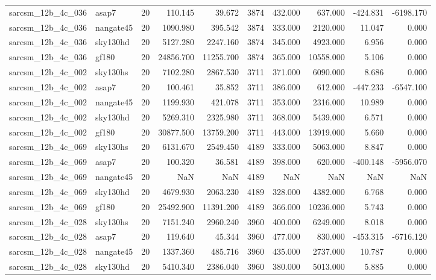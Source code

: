 \begin{longtable}{llrrrrrrrr}
sarcsm\_12b\_4c\_036 & asap7 & 20 & 110.145 & 39.672 & 3874 & 432.000 & 637.000 & -424.831 & -6198.170 \\
sarcsm\_12b\_4c\_036 & nangate45 & 20 & 1090.980 & 395.542 & 3874 & 333.000 & 2120.000 & 11.047 & 0.000 \\
sarcsm\_12b\_4c\_036 & sky130hd & 20 & 5127.280 & 2247.160 & 3874 & 345.000 & 4923.000 & 6.956 & 0.000 \\
sarcsm\_12b\_4c\_036 & gf180 & 20 & 24856.700 & 11255.700 & 3874 & 365.000 & 10558.000 & 5.106 & 0.000 \\
sarcsm\_12b\_4c\_002 & sky130hs & 20 & 7102.280 & 2867.530 & 3711 & 371.000 & 6090.000 & 8.686 & 0.000 \\
sarcsm\_12b\_4c\_002 & asap7 & 20 & 100.461 & 35.852 & 3711 & 386.000 & 612.000 & -447.233 & -6547.100 \\
sarcsm\_12b\_4c\_002 & nangate45 & 20 & 1199.930 & 421.078 & 3711 & 353.000 & 2316.000 & 10.989 & 0.000 \\
sarcsm\_12b\_4c\_002 & sky130hd & 20 & 5269.310 & 2325.980 & 3711 & 368.000 & 5439.000 & 6.571 & 0.000 \\
sarcsm\_12b\_4c\_002 & gf180 & 20 & 30877.500 & 13759.200 & 3711 & 443.000 & 13919.000 & 5.660 & 0.000 \\
sarcsm\_12b\_4c\_069 & sky130hs & 20 & 6131.670 & 2549.450 & 4189 & 333.000 & 5063.000 & 8.847 & 0.000 \\
sarcsm\_12b\_4c\_069 & asap7 & 20 & 100.320 & 36.581 & 4189 & 398.000 & 620.000 & -400.148 & -5956.070 \\
sarcsm\_12b\_4c\_069 & nangate45 & 20 & NaN & NaN & 4189 & NaN & NaN & NaN & NaN \\
sarcsm\_12b\_4c\_069 & sky130hd & 20 & 4679.930 & 2063.230 & 4189 & 328.000 & 4382.000 & 6.768 & 0.000 \\
sarcsm\_12b\_4c\_069 & gf180 & 20 & 25492.900 & 11391.200 & 4189 & 366.000 & 10236.000 & 5.743 & 0.000 \\
sarcsm\_12b\_4c\_028 & sky130hs & 20 & 7151.240 & 2960.240 & 3960 & 400.000 & 6249.000 & 8.018 & 0.000 \\
sarcsm\_12b\_4c\_028 & asap7 & 20 & 119.640 & 45.344 & 3960 & 477.000 & 830.000 & -453.315 & -6716.120 \\
sarcsm\_12b\_4c\_028 & nangate45 & 20 & 1337.360 & 485.716 & 3960 & 435.000 & 2737.000 & 10.787 & 0.000 \\
sarcsm\_12b\_4c\_028 & sky130hd & 20 & 5410.340 & 2386.040 & 3960 & 380.000 & 5013.000 & 5.885 & 0.000 \\

\end{longtable}
